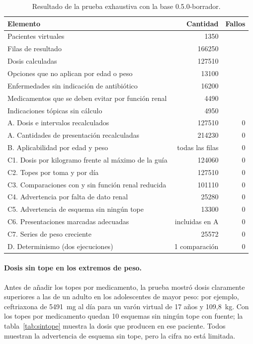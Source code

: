 \documentclass[11pt,a4paper]{article}
\begin{document}
\begin{table}[htbp]
\centering
\caption{Resultado de la prueba exhaustiva con la base 0.5.0-borrador.}
\label{tab:exhaustiva}
\small
\begin{tabular}{@{}lrr@{}}
\toprule
Elemento & Cantidad & Fallos \\
\midrule
Pacientes virtuales & \num{1350} & \\
Filas de resultado & \num{166250} & \\
\quad Dosis calculadas & \num{127510} & \\
\quad Opciones que no aplican por edad o peso & \num{13100} & \\
\quad Enfermedades sin indicación de antibiótico & \num{16200} & \\
\quad Medicamentos que se deben evitar por función renal & \num{4490} & \\
\quad Indicaciones tópicas sin cálculo & \num{4950} & \\
\midrule
A. Dosis e intervalos recalculados & \num{127510} & 0 \\
A. Cantidades de presentación recalculadas & \num{214230} & 0 \\
B. Aplicabilidad por edad y peso & todas las filas & 0 \\
C1. Dosis por kilogramo frente al máximo de la guía & \num{124060} & 0 \\
C2. Topes por toma y por día & \num{127510} & 0 \\
C3. Comparaciones con y sin función renal reducida & \num{101110} & 0 \\
C4. Advertencia por falta de dato renal & \num{25280} & 0 \\
C5. Advertencia de esquema sin ningún tope & \num{13300} & 0 \\
C6. Presentaciones marcadas adecuadas & incluidas en A & 0 \\
C7. Series de peso creciente & \num{25572} & 0 \\
D. Determinismo (dos ejecuciones) & 1 comparación & 0 \\
\bottomrule
\end{tabular}
\end{table}

\paragraph{Dosis sin tope en los extremos de peso.} Antes de añadir los topes por medicamento, la prueba mostró dosis claramente superiores a las de un adulto en los adolescentes de mayor peso: por ejemplo, ceftriaxona de \num{5491}~mg al día para un varón virtual de 17 años y 109,8~kg. Con los topes por medicamento quedan 10 esquemas sin ningún tope con fuente; la tabla~\ref{tab:sintope} muestra la dosis que producen en ese paciente. Todos muestran la advertencia de esquema sin tope, pero la cifra no está limitada.
\end{document}
